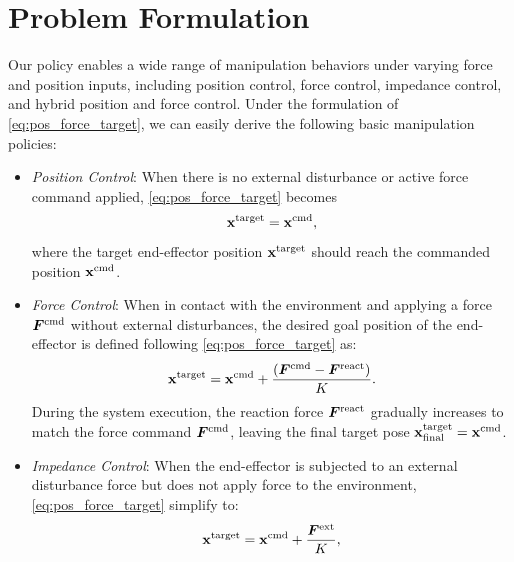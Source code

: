 \documentclass{article}
\begin{document}
\section{Problem Formulation} \label{sec:appendix:formulation}
Our policy enables a wide range of manipulation behaviors under varying force and position inputs, including position control, force control, impedance control, and hybrid position and force control. Under the formulation of \cref{eq:pos_force_target}, we can easily derive the following basic manipulation policies:
\begin{itemize}
    \item[\textit{a)}] {
        \textit{Position Control}: When there is no external disturbance or active force command applied, \cref{eq:pos_force_target} becomes 
        \begin{equation}
            {\mathbf{x}}^{\text{target}} = {\mathbf{x}}^{\text{cmd}},
            \label{eq:pos_control}
        \end{equation}
        where the target end-effector position ${\mathbf{x}}^{\text{target}}$ should reach the commanded position ${\mathbf{x}}^{\text{cmd}}$.
    }
    \item[\textit{b)}] {
        \textit{Force Control}: When in contact with the environment and applying a force ${\bm{F}}^{\text{cmd}}$ without external disturbances, the desired goal position of the end-effector is defined following \cref{eq:pos_force_target} as:
        \begin{equation}
            \begin{aligned}
                {\mathbf{x}}^{\text{target}} = {\mathbf{x}}^{\text{cmd}} + \frac{({\bm{F}}^{\text{cmd}} - {\bm{F}}^{\text{react}})}{K}.
            \end{aligned}
            \label{eq:force_control}
        \end{equation}
        During the system execution, the reaction force ${\bm{F}}^{\text{react}}$ gradually increases to match the force command ${\bm{F}}^{\text{cmd}}$, leaving the final target pose ${\mathbf{x}}^{\text{target}}_\text{final} = {\mathbf{x}}^{\text{cmd}}$.
    }
    \item[\textit{c)}] {
        \textit{Impedance Control}: When the end-effector is subjected to an external disturbance force but does not apply force to the environment, \cref{eq:pos_force_target} simplify to:
        \begin{equation}
            {\mathbf{x}}^{\text{target}} = {\mathbf{x}}^{\text{cmd}} + \frac{{\bm{F}}^{\text{ext}}}{K},
            \label{eq:impedance_control}
        \end{equation}
}
\end{itemize}
\end{document}
